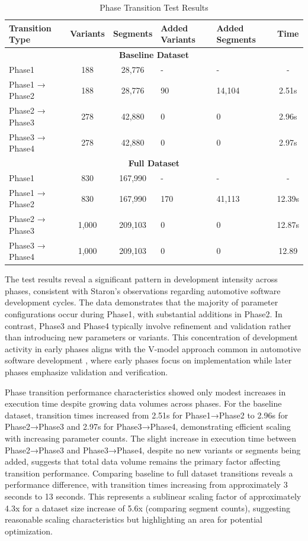 \begin{table}[h]
\centering
\caption{Phase Transition Test Results}
\label{tab:phase-transition-results}
\begin{tabular}{|l|c|c|p{2cm}|p{2cm}|c|}
\hline
\textbf{Transition Type} & \textbf{Variants} & \textbf{Segments} & \textbf{Added Variants} & \textbf{Added Segments} & \textbf{Time} \\
\hline
\multicolumn{6}{|c|}{\textbf{Baseline Dataset}} \\
\hline
Phase1 & 188 & 28,776 & - & - & - \\
\hline
Phase1 → Phase2 & 188 & 28,776 & 90 & 14,104 & 2.51s \\
\hline
Phase2 → Phase3 & 278 & 42,880 & 0 & 0 & 2.96s \\
\hline
Phase3 → Phase4 & 278 & 42,880 & 0 & 0 & 2.97s \\
\hline
\multicolumn{6}{|c|}{\textbf{Full Dataset}} \\
\hline
Phase1 & 830 & 167,990 & - & - & - \\
\hline
Phase1 → Phase2 & 830 & 167,990 & 170 & 41,113 & 12.39s \\
\hline
Phase2 → Phase3 & 1,000 & 209,103 & 0 & 0 & 12.87s \\
\hline
Phase3 → Phase4 & 1,000 & 209,103 & 0 & 0 & 12.89 \\
\hline
\end{tabular}
\end{table}

The test results reveal a significant pattern in development intensity across phases, consistent with Staron's observations \cite{staron2021automotive} regarding automotive software development cycles. The data demonstrates that the majority of parameter configurations occur during Phase1, with substantial additions in Phase2. In contrast, Phase3 and Phase4 typically involve refinement and validation rather than introducing new parameters or variants. This concentration of development activity in early phases aligns with the V-model approach common in automotive software development \cite{pretschner2007software}, where early phases focus on implementation while later phases emphasize validation and verification.

Phase transition performance characteristics showed only modest increases in execution time despite growing data volumes across phases. For the baseline dataset, transition times increased from 2.51s for Phase1→Phase2 to 2.96s for Phase2→Phase3 and 2.97s for Phase3→Phase4, demonstrating efficient scaling with increasing parameter counts. The slight increase in execution time between Phase2→Phase3 and Phase3→Phase4, despite no new variants or segments being added, suggests that total data volume remains the primary factor affecting transition performance. Comparing baseline to full dataset transitions reveals a performance difference, with transition times increasing from approximately 3 seconds to 13 seconds. This represents a sublinear scaling factor of approximately 4.3x for a dataset size increase of 5.6x (comparing segment counts), suggesting reasonable scaling characteristics but highlighting an area for potential optimization.

